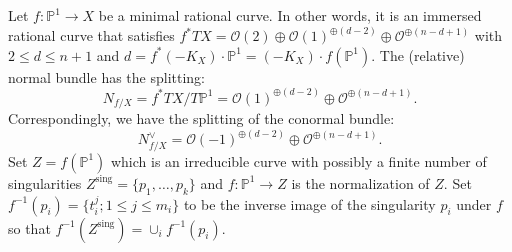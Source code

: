 \documentclass[12pt]{amsart}
\theoremstyle{definition}
\newcommand{\IP}{{\mathbb P}}
\newcommand{\CO}{{\mathcal O}}
\begin{document}
Let $f: \IP^1\rightarrow X$ be a  
minimal rational curve. In other words, it is
an immersed rational curve that satisfies $f^*TX=\CO(2)\oplus\CO(1)^{\oplus (d-2)}\oplus \CO^{\oplus(n-d+1)}$ with $2\le d\le n+1$ and $d=f^*(-K_X)\cdot \IP^1=(-K_X)\cdot f(\IP^1)$. The (relative) normal bundle has the splitting: 
\begin{equation}\label{eq-split}
N_{f/X}=f^*TX/T\IP^1=\CO(1)^{\oplus (d-2)}\oplus\CO^{\oplus (n-d+1)}. 
\end{equation}
Correspondingly, we have the splitting of the conormal bundle:
\begin{equation*}
    N^\vee_{f/X}=\CO(-1)^{\oplus (d-2)}\oplus \CO^{\oplus(n-d+1)}. 
\end{equation*}
Set $Z=f(\IP^1)$ which is an irreducible curve with possibly a finite number of singularities $Z^{\mathrm{sing}}=\{p_1, \dots, p_k\}$ and $f: \IP^1\rightarrow Z$ is the normalization of $Z$. 
Set $f^{-1}(p_i)=\{t_i^j; 1\le j\le m_i \}$ to be the inverse image of the singularity $p_i$ under $f$ so that $f^{-1}(Z^{\mathrm{sing}})=\cup_i f^{-1}(p_i)$. %
\end{document}
